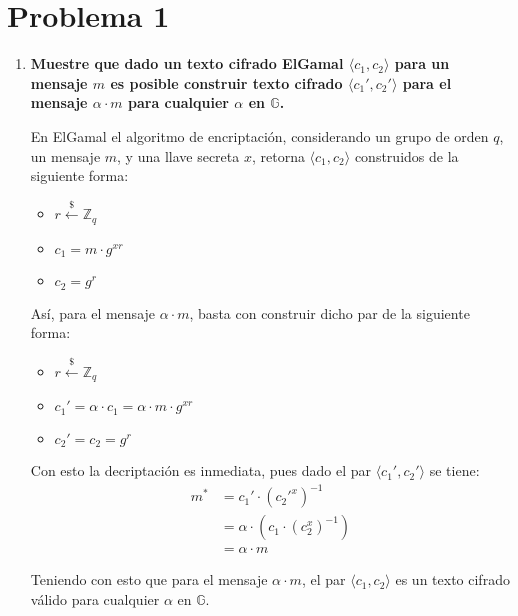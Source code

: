 \documentclass[twoside]{tareas}
\newcommand{\getunif}{\stackrel{\$}{\gets}}
\begin{document}
\maketitle

\section*{Problema 1}

\begin{enumerate}
    \item \textbf{Muestre que dado un texto cifrado ElGamal {\boldmath$ \langle c_1, c_2 \rangle$} para un mensaje {\boldmath$m$} es posible construir texto cifrado {\boldmath$\langle c_1',c_2' \rangle$} para el mensaje {\boldmath$ \alpha \cdot m$} para cualquier {\boldmath$\alpha$} en {\boldmath$\mathbb{G}$}.}

    En ElGamal el algoritmo de encriptación, considerando un grupo de orden $q$, un mensaje $m$, y una llave secreta $x$, retorna $ \langle c_1, c_2 \rangle$ construidos de la siguiente forma:
    \begin{itemize}
        \item $r \getunif \mathbb{Z}_q$
        \item $c_1 = m \cdot g^{xr}$
        \item $c_2 = g^{r}$
    \end{itemize}

    Así, para el mensaje $\alpha \cdot m$, basta con construir dicho par de la siguiente forma:
    \begin{itemize}
        \item $r \getunif \mathbb{Z}_q$
        \item $c_1' = \alpha \cdot c_1 = \alpha \cdot m \cdot g^{xr}$
        \item $c_2' = c_2 = g^{r}$
    \end{itemize}

    Con esto la decriptación es inmediata, pues dado el par $ \langle c_1', c_2' \rangle$ se tiene:
    \begin{align*}
        m^* &= c_1' \cdot (c_2'^x)^{-1}\\
        &= \alpha \cdot (c_1 \cdot (c_2^x)^{-1})\\
        &= \alpha \cdot m
    \end{align*}

    Teniendo con esto que para el mensaje $\alpha \cdot m$, el par $ \langle c_1, c_2 \rangle$ es un texto cifrado válido para cualquier $\alpha$ en $\mathbb{G}$.


\end{enumerate}
\end{document}
